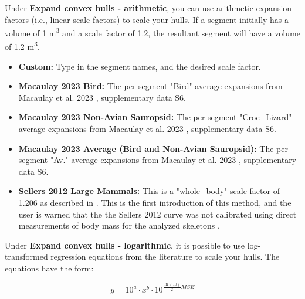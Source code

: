 \documentclass{article}
\begin{document}
Under \textbf{Expand convex hulls - arithmetic}, you can use arithmetic expansion factors (i.e., linear scale factors) to scale your hulls. If a segment initially has a volume of 1 \si{m^3} and a scale factor of 1.2, the resultant segment will have a volume of 1.2 \si{m^3}. 

\begin{itemize}
    \item \textbf{Custom:} Type in the segment names, and the desired scale factor.
    \item \textbf{Macaulay 2023 Bird:} The per-segment "Bird" average expansions from Macaulay et al. 2023 \cite{macaulayDecouplingBodyShape2023}, supplementary data S6.
    \item \textbf{Macaulay 2023 Non-Avian Sauropsid:} The per-segment "Croc\_Lizard" average expansions from Macaulay et al. 2023 \cite{macaulayDecouplingBodyShape2023}, supplementary data S6.
    \item \textbf{Macaulay 2023 Average (Bird and Non-Avian Sauropsid):} The per-segment "Av." average expansions from Macaulay et al. 2023 \cite{macaulayDecouplingBodyShape2023}, supplementary data S6.
    \item \textbf{Sellers 2012 Large Mammals:} This is a "whole\_body" scale factor of 1.206 as described in \cite{sellersMinimumConvexHull2012}. This is the first introduction of this method, and the user is warned that the the Sellers 2012 curve was not calibrated using direct measurements of body mass for the analyzed skeletons \cite{sellersMinimumConvexHull2012}.
\end{itemize}

Under \textbf{Expand convex hulls - logarithmic}, it is possible to use log-transformed regression equations from the literature to scale your hulls. 
The equations have the form:

\begin{equation}
y = 10^a \cdot x^{b} \cdot 10^{\frac{\ln(10)}{2} MSE }
\label{eq:powercurve}
\end{equation}
\end{document}
